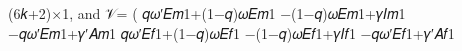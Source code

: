 (6𝑘+2)×1, and 𝒱=
(              𝑞𝜔′𝐸𝑚1+(1−𝑞)𝜔𝐸𝑚1
−(1−𝑞)𝜔𝐸𝑚1+𝛾𝐼𝑚1
−𝑞𝜔′𝐸𝑚1+𝛾′𝐴𝑚1
𝑞𝜔′𝐸𝑓1+(1−𝑞)𝜔𝐸𝑓1
−(1−𝑞)𝜔𝐸𝑓1+𝛾𝐼𝑓1
−𝑞𝜔′𝐸𝑓1+𝛾′𝐴𝑓1